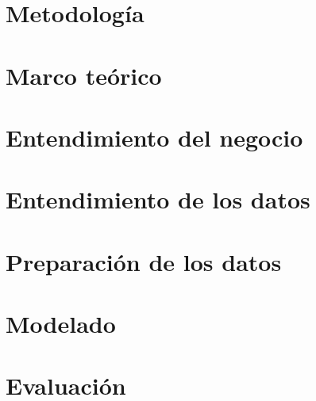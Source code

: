 \documentclass[11pt,twoside]{docs/thesis}
\begin{document}
\chapter{Metodología}


\chapter{Marco teórico} \label{visglob}


\chapter{Entendimiento del negocio}
\label{crisp1}


\chapter{Entendimiento de los datos}
\label{crisp2}


\chapter{Preparación de los datos} 
\label{crisp3}


% 

\chapter{Modelado}\label{crisp4}
\label{crisp4}


\chapter{Evaluación}
\label{crisp5}


% 
\end{document}
